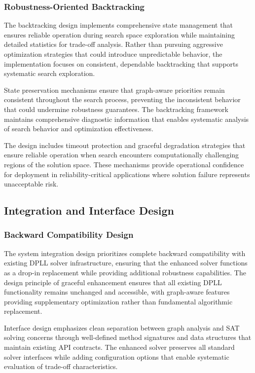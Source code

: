\subsubsection{Robustness-Oriented Backtracking}

The backtracking design implements comprehensive state management that ensures reliable operation during search space exploration while maintaining detailed statistics for trade-off analysis. Rather than pursuing aggressive optimization strategies that could introduce unpredictable behavior, the implementation focuses on consistent, dependable backtracking that supports systematic search exploration.

State preservation mechanisms ensure that graph-aware priorities remain consistent throughout the search process, preventing the inconsistent behavior that could undermine robustness guarantees. The backtracking framework maintains comprehensive diagnostic information that enables systematic analysis of search behavior and optimization effectiveness.

The design includes timeout protection and graceful degradation strategies that ensure reliable operation when search encounters computationally challenging regions of the solution space. These mechanisms provide operational confidence for deployment in reliability-critical applications where solution failure represents unacceptable risk.

\subsection{Integration and Interface Design}

\subsubsection{Backward Compatibility Design}

The system integration design prioritizes complete backward compatibility with existing DPLL solver infrastructure, ensuring that the enhanced solver functions as a drop-in replacement while providing additional robustness capabilities. The design principle of graceful enhancement ensures that all existing DPLL functionality remains unchanged and accessible, with graph-aware features providing supplementary optimization rather than fundamental algorithmic replacement.

Interface design emphasizes clean separation between graph analysis and SAT solving concerns through well-defined method signatures and data structures that maintain existing API contracts. The enhanced solver preserves all standard solver interfaces while adding configuration options that enable systematic evaluation of trade-off characteristics.

